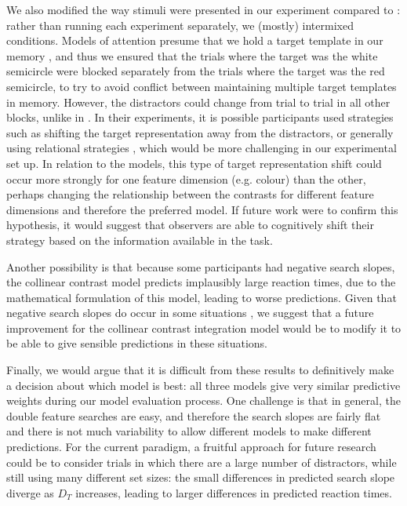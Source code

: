\documentclass[preprint,12pt,authoryear]{elsarticle}
\begin{document}
We also modified the way stimuli were presented in our experiment compared to \cite{buetti2019predicting}: rather than running each experiment separately, we (mostly) intermixed conditions. Models of attention presume that we hold a target template in our memory \citep{duncan1989visual}, and thus we ensured that the trials where the target was the white semicircle were blocked separately from the trials where the target was the red semicircle, to try to avoid conflict between maintaining multiple target templates in memory. However, the distractors could change from trial to trial in all other blocks, unlike in \cite{buetti2019predicting}. In their experiments, it is possible participants used strategies such as shifting the target representation away from the distractors, or generally using relational strategies \citep{navalpakkam2007search, becker2010role, yu2023good}, which would be more challenging in our experimental set up. In relation to the models, this type of target representation shift could occur more strongly for one feature dimension (e.g. colour) than the other, perhaps changing the relationship between the contrasts for different feature dimensions and therefore the preferred model. If future work were to confirm this hypothesis, it would suggest that observers are able to cognitively shift their strategy based on the information available in the task.

Another possibility is that because some participants had negative search slopes, the collinear contrast model predicts implausibly large reaction times, due to the mathematical formulation of this model, leading to worse predictions. Given that negative search slopes do occur in some situations \citep{utochkin2013visual}, we suggest that a future improvement for the collinear contrast integration model would be to modify it to be able to give sensible predictions in these situations.

Finally, we would argue that it is difficult from these results to definitively make a decision about which model is best: all three models give very similar predictive weights during our model evaluation process. One challenge is that in general, the double feature searches are easy, and therefore the search slopes are fairly flat and there is not much variability to allow different models to make different predictions. For the current paradigm, a fruitful approach for future research could be to consider trials in which there are a large number of distractors, while still using many different set sizes: the small differences in predicted search slope diverge as $D_T$ increases, leading to larger differences in predicted reaction times.
\end{document}
